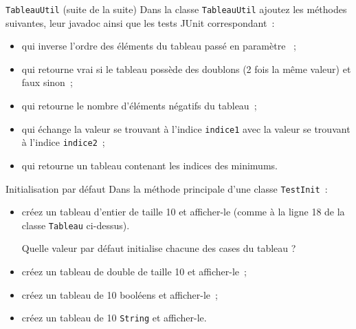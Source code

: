 \documentclass[a4paper,11pt]{article}
\begin{document}
	\begin{Exercice}{\texttt{TableauUtil} (suite de la suite)}	
		Dans la classe \texttt{TableauUtil} ajoutez les méthodes suivantes, leur
		 javadoc ainsi que les tests JUnit correspondant~:
		\begin{itemize}
			\item {} 
				qui inverse l'ordre des éléments  du tableau passé en paramètre ~;
			\item {} 
				qui retourne vrai si le tableau possède des doublons 
				(2 fois la même valeur) et faux sinon~;
			\item {} 
				qui retourne le nombre d'éléments négatifs du tableau~;
			\item {} 
				qui échange la valeur se trouvant à l'indice \texttt{indice1} 
				avec la valeur se trouvant à l'indice \texttt{indice2}~;
			\item {} 
				qui retourne un tableau contenant les indices des minimums.
		\end{itemize}
	\end{Exercice}
	
		
	\begin{Exercice}{Initialisation par défaut}	
		Dans la méthode principale d'une classe \texttt{TestInit}~:
		\begin{itemize}
			\item créez un tableau d'entier de taille 10 et afficher-le 
				(comme à  la ligne 18 de la classe \texttt{Tableau} ci-dessus). 
				
				Quelle valeur par défaut initialise chacune des cases du tableau ?
			\item créez un tableau de double de taille 10 et afficher-le~;
			\item créez un tableau de 10 booléens et afficher-le~;
			\item créez un tableau de 10 \texttt{String} et afficher-le.
		\end{itemize}
	\end{Exercice}
\end{document}
